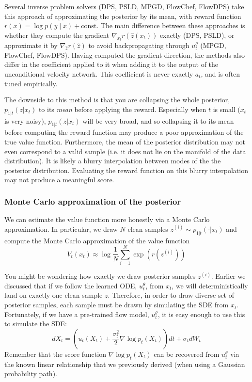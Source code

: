 \documentclass[12pt,a4paper]{report}
\begin{document}
Several inverse problem solvers (DPS, PSLD, MPGD, FlowChef, FlowDPS) take this approach of approximating the posterior by its mean, with reward function $r(x) = \log p(y \mid x) + \text{const}$. The main difference between these approaches is whether they compute the gradient $\nabla_{x_t} r(\hat{z}(x_t))$ exactly (DPS, PSLD), or approximate it by $\nabla_{\hat{z}} r(\hat{z})$ to avoid backpropagating through $u_t^\theta$ (MPGD, FlowChef, FlowDPS). Having computed the gradient direction, the methods also differ in the coefficient applied to it when adding it to the output of the unconditional velocity network. This coefficient is never exactly $a_t$, and is often tuned empirically. 

The downside to this method is that you are collapsing the whole posterior, $ p_{1|t}(z|x_t)$ to its \textit{mean} before applying the reward. Especially when $t$ is small ($x_t$ is very noisy), $p_{1|t}(z|x_t)$ will be very broad, and so collapsing it to its mean before computing the reward function may produce a poor approximation of the true value function. Furthermore, the mean of the posterior distribution may not even correspond to a valid sample (i.e. it does not lie on the manifold of the data distribution). It is likely a blurry interpolation between modes of the the posterior distribution. Evaluating the reward function on this blurry interpolation may not produce a meaningful score. 

\subsubsection{Monte Carlo approximation of the posterior} We can estimate the value function more honestly via a Monte Carlo approximation. In particular, we draw $N$ clean samples $z^{(i)} \sim p_{1|t}(\cdot|x_t)$ and compute the Monte Carlo approximation of the value function
\begin{equation}
\label{eq:exact_monte_carlo_approximation}
    V_t(x_t) \approx \log \frac{1}{N} \sum_{i=1}^N \exp \left( r(z^{(i)}) \right)
\end{equation}

You might be wondering how exactly we draw posterior samples $z^{(i)}$. Earlier we discussed that if we follow the learned ODE, $u_t^\theta$, from $x_t$, we will deterministically land on exactly one clean sample $z$. Therefore, in order to draw diverse set of posterior samples, each sample must be drawn by simulating the SDE from $x_t$. Fortunately, if we have a pre-trained flow model, $u_t^\theta$, it is easy enough to use this to simulate the SDE:
$$dX_t = \left( u_t(X_t) + \frac{\sigma_t^2}{2} \nabla \log p_t(X_t) \right) dt + \sigma_t dW_t$$
Remember that the score function $\nabla \log p_t(X_t)$ can be recovered from $u_t^\theta$ via the known linear relationship that we previously derived (when using a Gaussian probability path). 
\end{document}
